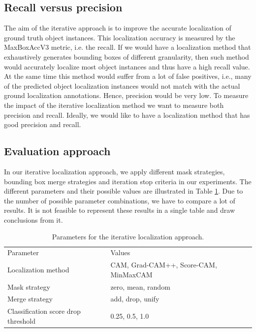 \subsection{Recall versus precision}
The aim of the iterative approach is to improve the accurate localization of ground truth object instances. This localization accuracy is measured by the MaxBoxAccV3 metric, i.e. the recall. If we would have a localization method that exhaustively generates bounding boxes of different granularity, then such method would accurately localize most object instances and thus have a high recall value. At the same time this method would suffer from a lot of false positives, i.e., many of the predicted object localization instances would not match with the actual ground localization annotations. Hence, precision would be very low. To measure the impact of the iterative localization method we want to measure both precision and recall. Ideally, we would like to have a localization method that has good precision and recall.

\subsection{Evaluation approach}
In our iterative localization approach, we apply different mask strategies, bounding box merge strategies and iteration stop criteria in our experiments. The different parameters and their possible values are illustrated in Table \ref{tab:iterative_localizaton_parameters}. Due to the number of possible parameter combinations, we have to compare a lot of results. It is not feasible to represent these results in a single table and draw conclusions from it.

\begin{table}[ht]
\centering
\begin{tabular}{ll}
\toprule
Parameter & Values\\
\cmidrule(lr){1-2}
Localization method & CAM, Grad-CAM++, Score-CAM, MinMaxCAM \\
Mask strategy & zero, mean, random \\
Merge strategy & add, drop, unify \\
Classification score drop threshold & 0.25, 0.5, 1.0 \\
\bottomrule
\end{tabular}
\caption[Parameters for the iterative localization approach]{Parameters for the iterative localization approach.}
\label{tab:iterative_localizaton_parameters}
\end{table}

